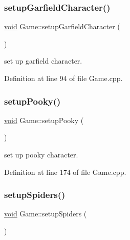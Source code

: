 \mbox{\label{class_game_a189a08079cbe642a324f19d0072faee7}} 
\subsubsection{\texorpdfstring{setupGarfieldCharacter()}{setupGarfieldCharacter()}}
{\footnotesize\ttfamily \mbox{\hyperlink{_s_d_l__opengles2__gl2ext_8h_ae5d8fa23ad07c48bb609509eae494c95}{void}} Game\+::setup\+Garfield\+Character (\begin{DoxyParamCaption}{ }\end{DoxyParamCaption})}



set up garfield character. 



Definition at line 94 of file Game.\+cpp.

\mbox{\label{class_game_a01e43c5cb9e24153bc3dc40bf9523ec1}} 
\subsubsection{\texorpdfstring{setupPooky()}{setupPooky()}}
{\footnotesize\ttfamily \mbox{\hyperlink{_s_d_l__opengles2__gl2ext_8h_ae5d8fa23ad07c48bb609509eae494c95}{void}} Game\+::setup\+Pooky (\begin{DoxyParamCaption}{ }\end{DoxyParamCaption})}



set up pooky character. 



Definition at line 174 of file Game.\+cpp.

\mbox{\label{class_game_a73567ddd32989b5fc977b61b4c927c89}} 
\subsubsection{\texorpdfstring{setupSpiders()}{setupSpiders()}}
{\footnotesize\ttfamily \mbox{\hyperlink{_s_d_l__opengles2__gl2ext_8h_ae5d8fa23ad07c48bb609509eae494c95}{void}} Game\+::setup\+Spiders (\begin{DoxyParamCaption}{ }\end{DoxyParamCaption})}



